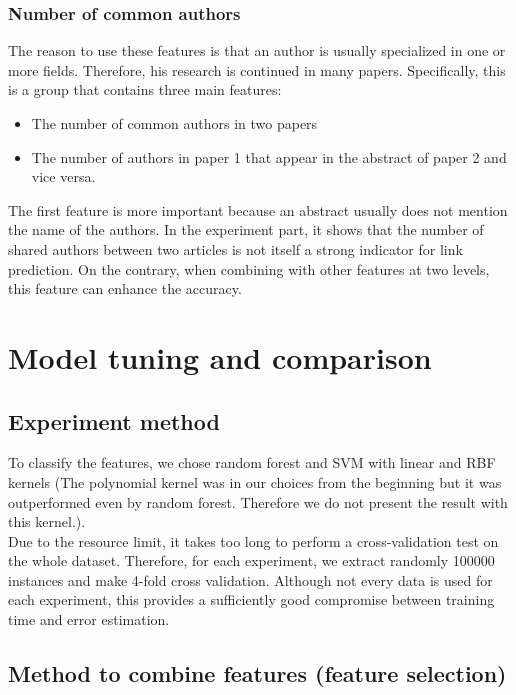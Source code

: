 \documentclass{article}
\begin{document}
\subsubsection{Number of common authors}

The reason to use these features is that an author is usually specialized in one or more fields. Therefore, his research is continued in many papers. Specifically, this is a group that contains three main features:
\begin{itemize}
\item The number of common authors in two papers
\item The number of authors in paper 1 that appear in the abstract of paper 2 and vice versa.
\end{itemize}
The first feature is more important because an abstract usually does not mention the name of the authors. In the experiment part, it shows that the number of shared authors between two articles is not itself a strong indicator for link prediction. On the contrary, when combining with other features at two levels, this feature can enhance the accuracy.

\section{Model tuning and comparison}
\label{sec:experiments}

\subsection{Experiment method}

To classify the features, we chose random forest and SVM with linear and RBF kernels (The polynomial kernel was in our choices from the beginning but it was outperformed even by random forest. Therefore we do not present the result with this kernel.).\\
Due to the resource limit, it takes too long to perform a cross-validation test on the whole dataset. Therefore, for each experiment, we extract randomly 100000 instances and make 4-fold cross validation. Although not every data is used for each experiment, this provides a sufficiently good compromise between training time and error estimation.

\subsection{Method to combine features (feature selection)}
\end{document}
